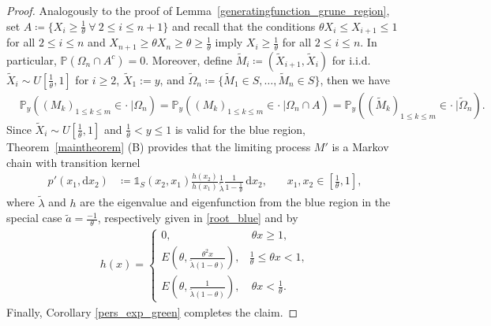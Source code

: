 \documentclass[12pt]{article}
\renewcommand{\P}{\mathbb{P}} %
\newcommand{\E}{\mathbb{E}} %
\newcommand{\1}{\mathds{1}}
\renewcommand{\d}{\mathrm{d}}
\theoremstyle{definition}
\theoremstyle{plain}
\theoremstyle{remark}
\begin{document}
\begin{proof}
   Analogously to the proof of Lemma~\ref{generatingfunction_grune_region}, set $A\coloneqq \{X_i\geq\frac{1}{\theta}~\forall~2\leq i\leq n+1\}$ and recall that the conditions $\theta X_i\leq X_{i+1}\leq 1$ for all $2\leq i\leq n$ and $X_{n+1}\geq\theta X_n\geq \theta\geq\frac{1}{\theta}$ imply $X_i\geq\frac{1}{\theta}$ for all $2\leq i \leq n$. In particular, $\P(\Omega_n\cap A^c)=0$.
    Moreover, define $\tilde{M}_i\coloneqq(\tilde X_{i+1},\tilde X_i)$ for i.i.d. $\tilde{X}_i \sim U\left[\frac{1}{\theta},1\right]$ for $i\geq 2$, $\tilde X_1:=y$, and $\tilde\Omega_n\coloneqq\{\tilde M_1\in S,\dots, \tilde M_n\in S\}$, then we have
    \begin{align*}
        &\P_{y}((M_k)_{1\leq k\leq m}\in\cdot~|\Omega_n)
        =\P_{y}((M_k)_{1\leq k\leq m}\in \cdot~|\Omega_n\cap A)
        =\P_{y}((\tilde M_k)_{1\leq k\leq m}\in\cdot~|\tilde\Omega_n).
    \end{align*}
    Since $\tilde{X}_i \sim U\left[\frac{1}{\theta},1\right]$ and $\frac{1}{\theta}< y\leq 1$ is valid for the blue region, Theorem~\ref{maintheorem} (B) provides that the limiting process $M'$ is a Markov chain with transition kernel
    \begin{align*}
    p'(x_1,\d x_2)&\coloneqq \mathds{1}_S(x_2,x_1)\frac{h(x_2)}{h(x_{1})}\frac{1}{\tilde\lambda}\frac{1}{1-\frac{1}{\theta}}\,\d x_2,~~~~~~~~x_1,x_2\in \left[\frac{1}{\theta},1\right],%
\end{align*}
where $\tilde\lambda$ and $h$ are the eigenvalue and eigenfunction from the blue region in the special case $\tilde a=\frac{-1}{\theta}$, respectively given in \eqref{root_blue} and by 
 \begin{align*}
        h(x)=\begin{cases}
            0,~~&~\theta x \ge1,
            \\E\left(\theta,\frac{\theta^2 x}{\tilde\lambda (1-\theta)}\right),&\frac{1}{\theta}\leq \theta x< 1,
            \\E\left(\theta,\frac{1}{\tilde\lambda (1-\theta)}\right),&~ \theta x< \frac{1}{\theta}.
        \end{cases}
 \end{align*}
  Finally, Corollary \ref{pers_exp_green} completes the claim.
\end{proof}
\end{document}
